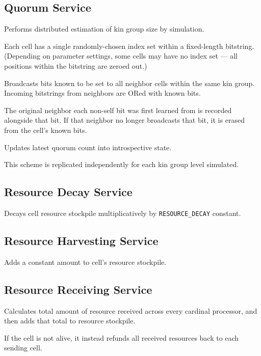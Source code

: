 \subsection{Quorum Service}


Performs distributed estimation of kin group size by simulation.

Each cell has a single randomly-chosen index set within a fixed-length bitstring.
(Depending on parameter settings, some cells may have no index set --- all positions within the bitstring are zeroed out.)

Broadcasts bits known to be set to all neighbor cells within the same kin group.
Incoming bitstrings from neighbors are ORed with known bits.

The original neighbor each non-self bit was first learned from is recorded alongside that bit.
If that neighbor no longer broadcasts that bit, it is erased from the cell's known bits.

Updates latest quorum count into introspective state.

This scheme is replicated independently for each kin group level simulated.

\subsection{Resource Decay Service}


Decays cell resource stockpile multiplicatively by \texttt{RESOURCE\_DECAY} constant.

\subsection{Resource Harvesting Service}


Adds a constant amount to cell's resource stockpile.

\subsection{Resource Receiving Service}


Calculates total amount of resource received across every cardinal processor, and then adds that total to resource stockpile.

If the cell is not alive, it instead refunds all received resources back to each sending cell.

